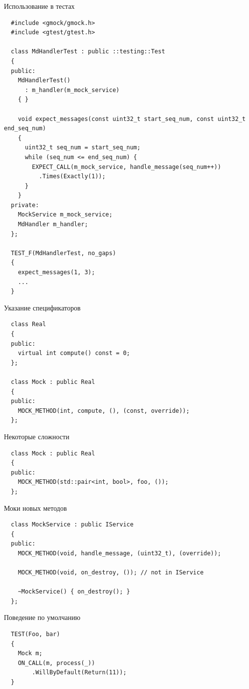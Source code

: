 \documentclass[unknownkeysallowed,xcolor=table]{beamer}
\begin{document}
\begin{frame}[fragile]{Использование в тестах}
  \begin{lstlisting}
  #include <gmock/gmock.h>
  #include <gtest/gtest.h>

  class MdHandlerTest : public ::testing::Test
  {
  public:
    MdHandlerTest()
      : m_handler(m_mock_service)
    { }

    void expect_messages(const uint32_t start_seq_num, const uint32_t end_seq_num)
    {
      uint32_t seq_num = start_seq_num;
      while (seq_num <= end_seq_num) {
        EXPECT_CALL(m_mock_service, handle_message(seq_num++))
          .Times(Exactly(1));
      }
    }
  private:
    MockService m_mock_service;
    MdHandler m_handler;
  };

  TEST_F(MdHandlerTest, no_gaps)
  {
    expect_messages(1, 3);
    ...
  }
  \end{lstlisting}
\end{frame}

\begin{frame}[fragile]{Указание спецификаторов}
  \begin{lstlisting}
  class Real
  {
  public:
    virtual int compute() const = 0;
  };

  class Mock : public Real
  {
  public:
    MOCK_METHOD(int, compute, (), (const, override));
  };
  \end{lstlisting}
\end{frame}

\begin{frame}[fragile]{Некоторые сложности}
  \begin{lstlisting}
  class Mock : public Real
  {
  public:
    MOCK_METHOD(std::pair<int, bool>, foo, ());
  };
  \end{lstlisting}
\end{frame}

\begin{frame}[fragile]{Моки новых методов}
  \begin{lstlisting}
  class MockService : public IService
  {
  public:
    MOCK_METHOD(void, handle_message, (uint32_t), (override));

    MOCK_METHOD(void, on_destroy, ()); // not in IService

    ~MockService() { on_destroy(); }
  };
  \end{lstlisting}
\end{frame}

\begin{frame}[fragile]{Поведение по умолчанию}
  \begin{lstlisting}
  TEST(Foo, bar)
  {
    Mock m;
    ON_CALL(m, process(_))
        .WillByDefault(Return(11));
  }
  \end{lstlisting}
\end{frame}
\end{document}

